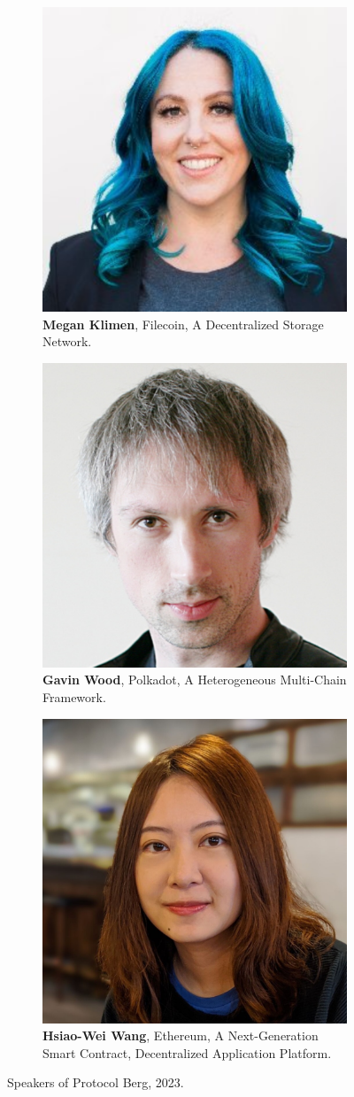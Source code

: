 \documentclass[a4paper,12pt]{article}
\begin{document}
\begin{figure}
  \medskip

  \begin{subfigure}[t]{.3\linewidth}
    \centering\includegraphics[width=.5\linewidth]{img/megan}
    \caption{\textbf{Megan Klimen}, Filecoin, A Decentralized Storage Network.}
  \end{subfigure}
  \begin{subfigure}[t]{.3\linewidth}
    \centering\includegraphics[width=.5\linewidth]{img/gavin}
    \caption{\textbf{Gavin Wood}, Polkadot, A Heterogeneous Multi-Chain Framework.}
  \end{subfigure}
  \begin{subfigure}[t]{.3\linewidth}
    \centering\includegraphics[width=.5\linewidth]{img/hsiao}
    \caption{\textbf{Hsiao-Wei Wang}, Ethereum, A Next-Generation Smart Contract, Decentralized Application Platform.}
  \end{subfigure}

  \caption{Speakers of Protocol Berg, 2023.}
  \end{figure}
\end{document}
